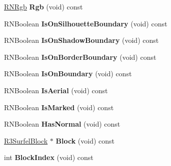 \begin{DoxyCompactItemize}
\item 
\hyperlink{class_r_n_rgb}{R\+N\+Rgb} {\bfseries Rgb} (void) const \hypertarget{class_r3_surfel_point_a5f9279b18d6293c557bfe6d1f46a2cba}{}\label{class_r3_surfel_point_a5f9279b18d6293c557bfe6d1f46a2cba}

\item 
R\+N\+Boolean {\bfseries Is\+On\+Silhouette\+Boundary} (void) const \hypertarget{class_r3_surfel_point_a9aeacfe66d3d020d51c4f19dbb713a3b}{}\label{class_r3_surfel_point_a9aeacfe66d3d020d51c4f19dbb713a3b}

\item 
R\+N\+Boolean {\bfseries Is\+On\+Shadow\+Boundary} (void) const \hypertarget{class_r3_surfel_point_ae07cd41526e5bbaf94407e7bc7bbf9c3}{}\label{class_r3_surfel_point_ae07cd41526e5bbaf94407e7bc7bbf9c3}

\item 
R\+N\+Boolean {\bfseries Is\+On\+Border\+Boundary} (void) const \hypertarget{class_r3_surfel_point_afa712d892287866ce4379f37c1772e36}{}\label{class_r3_surfel_point_afa712d892287866ce4379f37c1772e36}

\item 
R\+N\+Boolean {\bfseries Is\+On\+Boundary} (void) const \hypertarget{class_r3_surfel_point_a9d947e9f78cc093035bcd3bbc8b820f7}{}\label{class_r3_surfel_point_a9d947e9f78cc093035bcd3bbc8b820f7}

\item 
R\+N\+Boolean {\bfseries Is\+Aerial} (void) const \hypertarget{class_r3_surfel_point_ae7c8572504851b48546a3d8872fc1460}{}\label{class_r3_surfel_point_ae7c8572504851b48546a3d8872fc1460}

\item 
R\+N\+Boolean {\bfseries Is\+Marked} (void) const \hypertarget{class_r3_surfel_point_ae217cbe7c5a7089d77c0eb4f81ca2ad3}{}\label{class_r3_surfel_point_ae217cbe7c5a7089d77c0eb4f81ca2ad3}

\item 
R\+N\+Boolean {\bfseries Has\+Normal} (void) const \hypertarget{class_r3_surfel_point_a0753df898f552f27b53511b24625530e}{}\label{class_r3_surfel_point_a0753df898f552f27b53511b24625530e}

\item 
\hyperlink{class_r3_surfel_block}{R3\+Surfel\+Block} $\ast$ {\bfseries Block} (void) const \hypertarget{class_r3_surfel_point_a53a9a98271226cb437ca44189fe2f7ca}{}\label{class_r3_surfel_point_a53a9a98271226cb437ca44189fe2f7ca}

\item 
int {\bfseries Block\+Index} (void) const \hypertarget{class_r3_surfel_point_a5a88a780f93969fa569f1736e400bac9}{}\label{class_r3_surfel_point_a5a88a780f93969fa569f1736e400bac9}


\end{DoxyCompactItemize}
